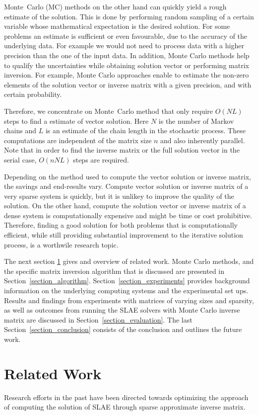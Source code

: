 \documentclass{juliacon}
\begin{document}
Monte~Carlo (MC) methods on the other hand can quickly yield a rough estimate of the solution. This is done by performing random sampling of a certain variable whose mathematical expectation is the desired solution. For some problems an estimate is sufficient or even favourable, due to the accuracy of the underlying data. For example we would not need to process data with a higher precision than the one of the input data. In addition, Monte Carlo methods help to qualify the uncertainties while obtaining solution vector or performing matrix inversion. For example, Monte Carlo approaches enable to estimate the non-zero elements of the solution vector or inverse matrix with a given precision, and with certain probability.

Therefore, we concentrate on Monte~Carlo method that only require $O(NL)$ steps to find a estimate of vector solution. Here $N$ is the number of Markov chains and $L$ is an estimate of the chain length in the stochastic process. These computations are independent of the matrix size $n$ and also inherently parallel. Note that in order to find the inverse matrix or the full solution vector in the serial case, $O(nNL)$ steps are required. 

Depending on the method used to compute the vector solution or inverse matrix, the savings and end-results vary. Compute vector solution or inverse matrix of a very sparse system is quickly, but it is unlikey to improve the quality of the solution. On the other hand, compute the solution vector or inverse matrix of a dense system is computationally expensive and might be time or cost prohibitive. Therefore, finding a good solution for both problems that is computationally efficient, while still providing substantial improvement to the iterative solution process, is a worthwile research topic. 

The next section \ref{section_related_work} gives and overview of related work. Monte Carlo methods, and the specific matrix inversion algorithm that is discussed are presented in Section~\ref{section_algorithm}. Section~\ref{section_experiments} provides background information on the underlying computing systems and the experimental set ups. Results and findings from experiments with matrices of varying sizes and sparsity, as well as outcomes from running the SLAE solvers with  Monte Carlo inverse matrix are discussed in Section~\ref{section_evaluation}. The last Section~\ref{section_conclusion} consists of  the conclusion and  outlines the future work.

\section{Related Work}
\label{section_related_work}
Research efforts in the past have been directed towards optimizing the approach of computing the solution of SLAE through sparse approximate inverse matrix. 
\end{document}
